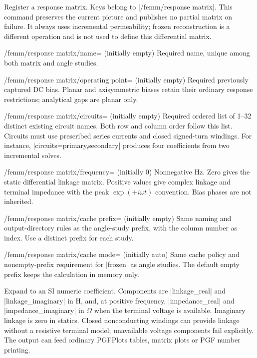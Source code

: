 \begin{command}{\femmresponsematrix{}}
  Register a response matrix. Keys belong to |/femm/response matrix|. This
  command preserves the current picture and publishes no partial matrix on
  failure. It always uses incremental permeability; frozen reconstruction is
  a different operation and is not used to define this differential matrix.
\end{command}
\begin{key}{/femm/response matrix/name= (initially empty)}
  Required name, unique among both matrix and angle studies.
\end{key}
\begin{key}{/femm/response matrix/operating point= (initially empty)}
  Required previously captured DC bias. Planar and axisymmetric biases retain
  their ordinary response restrictions; analytical gaps are planar only.
\end{key}
\begin{key}{/femm/response matrix/circuits= (initially empty)}
  Required ordered list of 1--32 distinct existing circuit names. Both row and
  column order follow this list. Circuits must use prescribed series currents
  and closed signed-turn windings. For instance, |circuits={primary,secondary}|
  produces four coefficients from two incremental solves.
\end{key}
\begin{key}{/femm/response matrix/frequency= (initially 0)}
  Nonnegative Hz. Zero gives the static differential linkage matrix. Positive
  values give complex linkage and terminal impedance with the peak
  $\exp(+i\omega t)$ convention. Bias phases are not inherited.
\end{key}
\begin{key}{/femm/response matrix/cache prefix= (initially empty)}
  Same naming and output-directory rules as the angle-study prefix, with the
  column number as index. Use a distinct prefix for each study.
\end{key}
\begin{key}{/femm/response matrix/cache mode= (initially auto)}
  Same cache policy and nonempty-prefix requirement for |frozen| as angle
  studies. The default empty prefix keeps the calculation in memory only.
\end{key}
\begin{command}{\femmmatrixentry{}}
  Expand to an SI numeric coefficient. Components are |linkage_real| and
  |linkage_imaginary| in H, and, at positive frequency, |impedance_real| and
  |impedance_imaginary| in $\Omega$ when the terminal voltage is available.
  Imaginary linkage is zero in statics. Closed nonconducting windings can
  provide linkage without a resistive terminal model; unavailable voltage
  components fail explicitly. The output can feed ordinary PGFPlots tables,
  matrix plots or PGF number printing.
\end{command}

